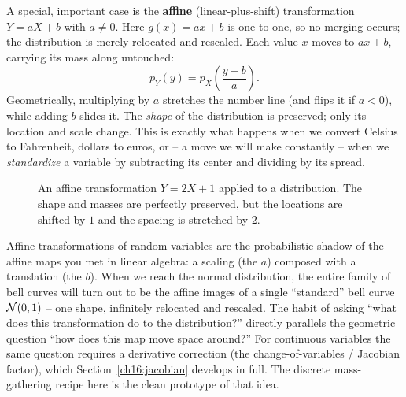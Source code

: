 A special, important case is the \textbf{affine} (linear-plus-shift) transformation
$Y = aX + b$ with $a \ne 0$. Here $g(x) = ax + b$ is one-to-one, so no merging occurs;
the distribution is merely relocated and rescaled. Each value $x$ moves to $ax + b$,
carrying its mass along untouched:
\[
  p_Y(y) = p_X\!\left(\frac{y - b}{a}\right).
\]
Geometrically, multiplying by $a$ stretches the number line (and flips it if $a < 0$),
while adding $b$ slides it. The \emph{shape} of the distribution is preserved; only its
location and scale change. This is exactly what happens when we convert Celsius to
Fahrenheit, dollars to euros, or -- a move we will make constantly -- when we
\emph{standardize} a variable by subtracting its center and dividing by its spread.

\begin{figure}[H]
\centering
{}
\caption{An affine transformation $Y = 2X + 1$ applied to a distribution. The shape and masses are perfectly preserved, but the locations are shifted by $1$ and the spacing is stretched by $2$.}
\label{ch06:fig-affine}
\end{figure}

\begin{connectionbox}
Affine transformations of random variables are the probabilistic shadow of the affine
maps you met in linear algebra: a scaling (the $a$) composed with a translation (the
$b$). When we reach the normal distribution, the entire family of bell curves will turn
out to be the affine images of a single ``standard'' bell curve $\mathcal{N}(0,1)$ -- one
shape, infinitely relocated and rescaled. The habit of asking ``what does this
transformation do to the distribution?'' directly parallels the geometric question ``how
does this map move space around?'' For continuous variables the same question requires
a derivative correction (the change-of-variables / Jacobian factor), which
Section~\ref{ch16:jacobian} develops in full. The discrete mass-gathering recipe here
is the clean prototype of that idea.
\end{connectionbox}

